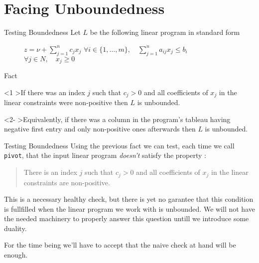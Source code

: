 \documentclass[aspectratio = 169]{beamer}
\begin{document}
\section{Facing Unboundedness}

\begin{frame}{Testing Boundedness}
    Let $L$ be the following linear program in standard form
    \begin{figure}
        \begin{linearProgG}{
            ${\displaystyle z = \nu + \sum_{j=1}^n c_jx_j}$
            }{
            ${\displaystyle \forall i \in \{1, \ldots, m\}, \quad \sum_{j=1}^n a_{ij}x_j \leq b_i}$
            }{
            $\forall j \in N, \quad x_j \geq 0$
            }
        \end{linearProgG}
    \end{figure}
    \begin{halfshyblock}{Fact}
      \begin{onlyenv}<1
        >If there was an index $j$ such that $c_j > 0$ and all
        coefficients of $x_{j}$ in the linear constraints were
        non-positive then $L$ is unbounded.
      \end{onlyenv}
      \begin{onlyenv}<2-
        >\!\alert{Equivalently, if there was a column in the program's tableau
        having negative first entry and only non-positive ones
        afterwards then $L$ is unbounded.}
      \end{onlyenv}
    \end{halfshyblock}
\end{frame}

\begin{frame}{Testing Boundedness}
  Using the previous fact we can test, each time we call
  \texttt{pivot}, that the input linear program
  \alert{\emph{doesn't}} satisfy the property :
    \begin{quote}
      There is an index $j$ such that $c_j > 0$ and all coefficients
      of $x_j$ in the linear constraints are non-positive.
    \end{quote}
    \pause
    This is a necessary healthy check, but there is yet no garantee
    that this condition is fullfilled when the linear program we work
    with is unbounded. We will not have the needed machinery to
    properly answer this question untill we introduce some
    duality.

    \pause
    For the time being we'll have to accept that the naive
    check at hand will be enough.
\end{frame}
\end{document}
